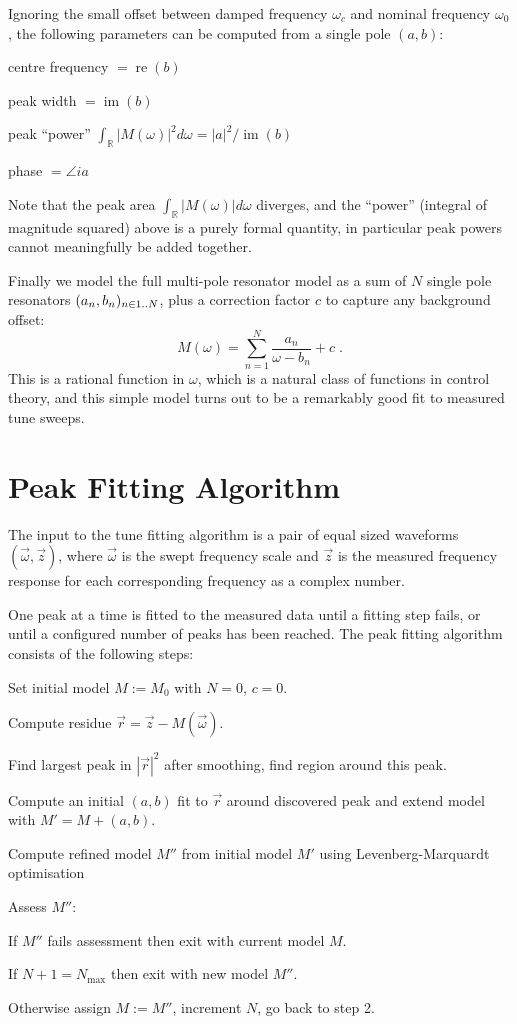 \documentclass[
    a4paper,
    keeplastbox,            %
    hyphens,                %
    nospread,               %
    refpage,                %
]{jacow}
\renewcommand{\Re}{\operatorname{re}}
\renewcommand{\Im}{\operatorname{im}}
\newcommand{\R}{\mathbb{R}}
\newcommand{\dotdot}{\mathinner{\ldotp\ldotp}}
\begin{document}
Ignoring the small offset between damped frequency $\omega_c$ and nominal
frequency $\omega_0$, the following parameters can be computed from a single
pole $(a,b)$:
\begin{Itemize}
\item centre frequency $=\Re(b)$
\item peak width $=\Im(b)$
\item peak ``power'' $\int_\R|M(\omega)|^2d\omega=|a|^2/\Im(b)$
\item phase $=\angle i a$
\end{Itemize}

Note that the peak area $\int_\R|M(\omega)|d\omega$ diverges, and the ``power''
(integral of magnitude squared) above is a purely formal quantity, in particular
peak powers cannot meaningfully be added together.

Finally we model the full multi-pole resonator model as a sum of $N$ single pole
resonators $(a_n,b_n)_{n\in1\dotdot N}$, plus a correction factor $c$ to capture
any background offset:
\[
    M(\omega) = \sum_{n=1}^N \frac{a_n}{\omega-b_n} + c \;.
\]
This is a rational function in $\omega$, which is a natural class of functions
in control theory, and this simple model turns out to be a remarkably good fit
to measured tune sweeps.


\section{Peak Fitting Algorithm}

The input to the tune fitting algorithm is a pair of equal sized waveforms
$(\vec{\omega},\vec{z})$, where $\vec{\omega}$ is the swept frequency scale and
$\vec{z}$ is the
measured frequency response for each corresponding frequency as a complex
number.

One peak at a time is fitted to the measured data until a fitting step fails, or
until a configured number of peaks has been reached.  The peak fitting algorithm
consists of the following steps:
\begin{Enumerate}
\item Set initial model $M:=M_0$ with $N=0$, $c=0$.
\item Compute residue $\vec{r}=\vec{z}-M(\vec{\omega})$.
\item Find largest peak in $|\vec{r}|^2$ after smoothing, find region around
    this peak.
\item Compute an initial $(a,b)$ fit to $\vec{r}$ around discovered peak and
    extend model with $M'=M+(a,b)$.
\item Compute refined model $M''$ from initial model $M'$ using
    Levenberg-Marquardt optimisation
\item Assess $M''$:
    \begin{Itemize}
    \item If $M''$ fails assessment then exit with current model $M$.
    \item If $N+1=N_{\text{max}}$ then exit with new model $M''$.
    \item Otherwise assign $M:=M''$, increment $N$, go back to step 2.
    \end{Itemize}
\end{Enumerate}
\end{document}
